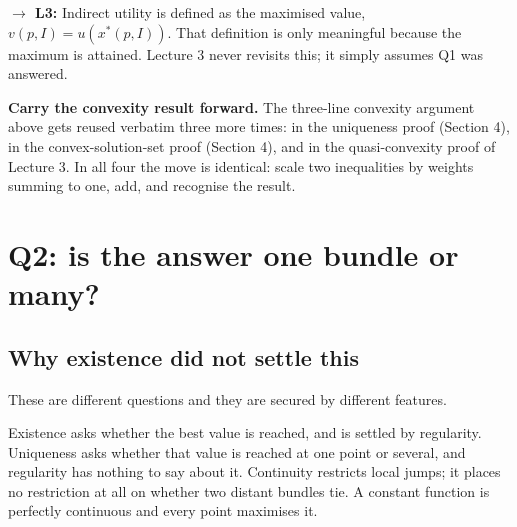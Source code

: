 \documentclass[11pt]{article}
\theoremstyle{definition}
\newenvironment{keybox}{\begin{snugshade}\noindent\ignorespaces}{\end{snugshade}}
\newcommand{\xs}{x^*}
\newcommand{\fwd}[1]{\textbf{\small $\rightarrow$ L3:} \small #1}
\begin{document}
\begin{keybox}
\fwd{Indirect utility is defined as the maximised value, $v(p,I)=u(\xs(p,I))$. That
definition is only meaningful because the maximum is attained. Lecture 3 never revisits
this; it simply assumes Q1 was answered.}
\end{keybox}

\vspace{4pt}
\noindent\textbf{Carry the convexity result forward.} The three-line convexity argument
above gets reused verbatim three more times: in the uniqueness proof (Section 4), in the
convex-solution-set proof (Section 4), and in the quasi-convexity proof of Lecture 3. In all
four the move is identical: scale two inequalities by weights summing to one, add, and
recognise the result.

\clearpage

\section{Q2: is the answer one bundle or many?}

\subsection{Why existence did not settle this}

These are different questions and they are secured by different features.

Existence asks whether the best value is reached, and is settled by regularity. Uniqueness
asks whether that value is reached at one point or several, and regularity has nothing to
say about it. Continuity restricts local jumps; it places no restriction at all on whether
two distant bundles tie. A constant function is perfectly continuous and every point
maximises it.

\begin{center}
\end{center}
\end{document}
